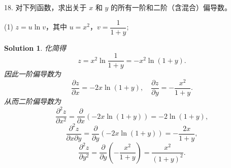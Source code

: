 \documentclass[a4paper,12pt]{article}
\newtheorem*{sol}{Solution}
\begin{document}
18. 对下列函数，求出关于 $x$ 和 $y$ 的所有一阶和二阶（含混合）偏导数。

(1) $z = u\ln v$，其中 $u = x^2$，$v = \dfrac{1}{1+y}$;
\begin{sol}
    化简得
    $$
        z = x^2 \ln\frac{1}{1+y} = -x^2 \ln(1+y).
    $$
    因此一阶偏导数为
    $$
        \frac{\partial z}{\partial x} = -2x\ln(1+y), \quad \frac{\partial z}{\partial y} = -\frac{x^2}{1+y}.
    $$
    从而二阶偏导数为
    $$
        \frac{\partial^2 z}{\partial x^2} = \frac{\partial}{\partial x}\left(-2x\ln(1+y)\right) = -2\ln(1+y),
    $$
    $$
        \frac{\partial^2 z}{\partial x\partial y} = \frac{\partial}{\partial y}\left(-2x\ln(1+y)\right) = -\frac{2x}{1+y},
    $$
    $$
        \frac{\partial^2 z}{\partial y^2} = \frac{\partial}{\partial y}\left(-\frac{x^2}{1+y}\right) = \frac{x^2}{(1+y)^2}.
    $$
\end{sol}
\end{document}
